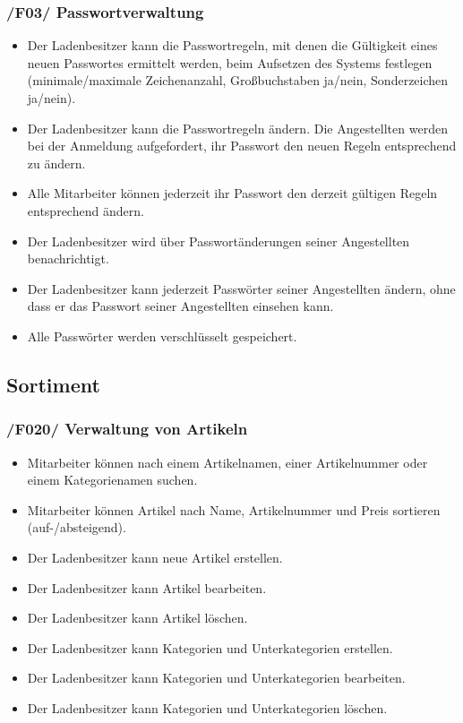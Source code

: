 \documentclass[pdftex,12pt,a4paper]{article}
\begin{document}
\subsubsection*{/F03/ Passwortverwaltung}
\begin{itemize}
\item Der Ladenbesitzer kann die Passwortregeln, mit denen die Gültigkeit eines neuen Passwortes ermittelt werden, beim Aufsetzen des Systems festlegen (minimale/maximale Zeichenanzahl, Gro\ss{}buchstaben ja/nein, Sonderzeichen ja/nein).
\item Der Ladenbesitzer kann die Passwortregeln \"andern. Die Angestellten werden bei der Anmeldung aufgefordert, ihr Passwort den neuen Regeln entsprechend zu \"andern.
\item Alle Mitarbeiter k\"onnen jederzeit ihr Passwort den derzeit g\"ultigen Regeln entsprechend \"andern.
\item Der Ladenbesitzer wird \"uber Passwort\"anderungen seiner Angestellten benachrichtigt.
\item Der Ladenbesitzer kann jederzeit Passw\"orter seiner Angestellten \"andern, ohne dass er das Passwort seiner Angestellten einsehen kann.
\item Alle Passw\"orter werden verschl\"usselt gespeichert.
\end{itemize}
\subsection*{Sortiment}
\subsubsection*{/F020/ Verwaltung von Artikeln}
\begin{itemize}
\item Mitarbeiter k\"onnen nach einem Artikelnamen, einer Artikelnummer oder einem Kategorienamen suchen.
\item Mitarbeiter k\"onnen Artikel nach Name, Artikelnummer und Preis sortieren (auf-/absteigend).
\item Der Ladenbesitzer kann neue Artikel erstellen.
\item Der Ladenbesitzer kann Artikel bearbeiten.
\item Der Ladenbesitzer kann Artikel l\"oschen.
\item Der Ladenbesitzer kann Kategorien und Unterkategorien erstellen.
\item Der Ladenbesitzer kann Kategorien und Unterkategorien bearbeiten.
\item Der Ladenbesitzer kann Kategorien und Unterkategorien l\"oschen.
\end{itemize}
\end{document}
